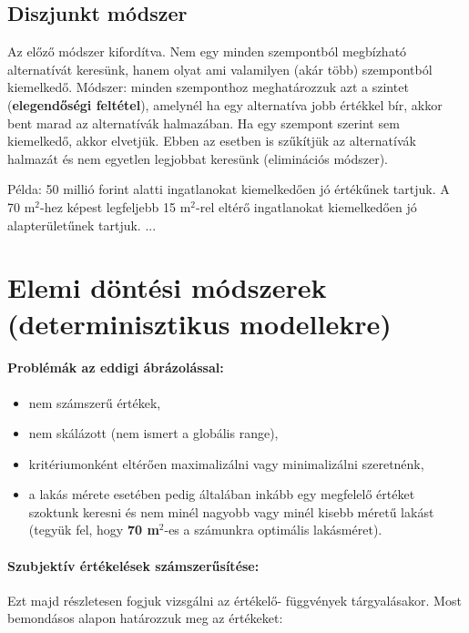 \documentclass[a4paper,12pt]{article}
\begin{document}
\subsection{Diszjunkt módszer}

Az előző módszer kifordítva. Nem egy minden szempontból megbízható alternatívát keresünk, hanem olyat ami valamilyen (akár több) szempontból kiemelkedő. Módszer: minden szemponthoz meghatározzuk azt a szintet (\textbf{elegendőségi feltétel}), amelynél ha egy alternatíva jobb értékkel bír, akkor bent marad az alternatívák halmazában. Ha egy szempont szerint sem kiemelkedő, akkor elvetjük. Ebben az esetben is szűkítjük az alternatívák halmazát és nem egyetlen legjobbat keresünk (eliminációs módszer).

Példa: 50 millió forint alatti ingatlanokat kiemelkedően jó értékűnek tartjuk. A 70 m$^2$-hez képest legfeljebb 15 m$^2$-rel eltérő ingatlanokat kiemelkedően jó alapterületűnek tartjuk. ...


\section{Elemi döntési módszerek (determinisztikus modellekre)}

\paragraph{Problémák az eddigi ábrázolással:}
\begin{itemize}
\item nem számszerű értékek,
\item nem skálázott (nem ismert a globális range),
\item kritériumonként eltérően maximalizálni vagy minimalizálni szeretnénk, 
\item a lakás mérete esetében pedig általában inkább egy megfelelő értéket szoktunk keresni és nem minél nagyobb vagy minél kisebb méretű lakást (tegyük fel, hogy \textbf{70 m$^2$}-es a számunkra optimális lakásméret).
\end{itemize}
\paragraph{Szubjektív értékelések számszerűsítése:}

Ezt majd részletesen fogjuk vizsgálni az értékelő- függvények tárgyalásakor. Most bemondásos alapon határozzuk meg az értékeket:
\end{document}
